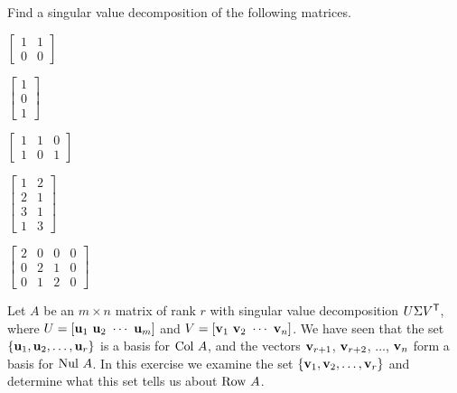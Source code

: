 \be
\item Find a singular value decomposition of the following matrices.
	\ba
	\begin{minipage}{2.0in}
	\item $\left[ \begin{array}{cc} 1&1\\0&0 \end{array} \right]$
	\end{minipage}
	\begin{minipage}{2.0in}
	\item $\left[ \begin{array}{c} 1\\0\\1 \end{array} \right]$
	\end{minipage}
	
	\begin{minipage}{2.0in}
	\item $\left[ \begin{array}{ccc} 1&1&0\\1&0&1 \end{array} \right]$
	\end{minipage}
	\begin{minipage}{2.0in}
	\item $\left[ \begin{array}{cc} 1&2\\2&1\\3&1\\1&3 \end{array} \right]$
	\end{minipage}
	
	\begin{minipage}{2.0in}
	\item $\left[ \begin{array}{cccc} 2&0&0&0\\0&2&1&0\\0&1&2&0 \end{array} \right]$
	\end{minipage}
	\ea
	
\item Let $A$ be an $m \times n$ matrix of rank $r$ with singular value decomposition $U \Sigma V^{\mathsf{T}}$, where $U = [ \vu_1 \ \vu_2 \ \cdots \ \vu_m ]$ and $V = [\vv_1 \ \vv_2 \ \cdots \ \vv_n]$. We have seen that the set $\{ \mathbf{u}_1, \mathbf{u}_2, \ldots, \mathbf{u}_r\}$  is a basis for $\text{Col } A$, and the vectors $\mathbf{v}_{r+1}$, $\mathbf{v}_{r+2}$, $\ldots$, $\mathbf{v}_n$ form a basis for $\text{Nul } A$. In this exercise we examine the set $\{\mathbf{v}_1, \mathbf{v}_2, \ldots, \mathbf{v}_r\}$ and determine what this set tells us about $\text{Row } A$. 


